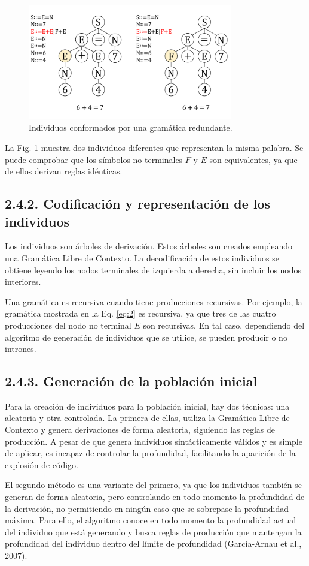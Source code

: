 \documentclass[spanish,a4paper,12pt,twoside]{report}
\begin{document}
    \begin{figure}[H]
      \centering
      \includegraphics[width = 0.8\textwidth]{resources/Fig6.pdf}
      \caption{Individuos conformados por una gramática redundante.}
      \label{fig:6}
    \end{figure} \par
    La Fig. \ref{fig:6} muestra dos individuos diferentes que representan la misma palabra. Se puede comprobar que los símbolos no terminales $F$ y $E$ son equivalentes, ya que de ellos derivan reglas idénticas. \par
    
    \subsection*{\large 2.4.2. Codificación y representación de los individuos}
    Los individuos son árboles de derivación. Estos árboles son creados empleando una Gramática Libre de Contexto. La decodificación de estos individuos se obtiene leyendo los nodos terminales de izquierda a derecha, sin incluir los nodos interiores. \par
    Una gramática es recursiva cuando tiene producciones recursivas. Por ejemplo, la gramática mostrada en la Eq. \ref{eq:2} es recursiva, ya que tres de las cuatro producciones del nodo no terminal $E$ son recursivas. En tal caso, dependiendo del algoritmo de generación de individuos que se utilice, se pueden producir o no intrones. 
    
    \subsection*{\large 2.4.3. Generación de la población inicial}
    Para la creación de individuos para la población inicial, hay dos técnicas: una aleatoria y otra controlada. La primera de ellas, utiliza la Gramática Libre de Contexto y genera derivaciones de forma aleatoria, siguiendo las reglas de producción. A pesar de que genera individuos sintácticamente válidos y es simple de aplicar, es incapaz de controlar la profundidad, facilitando la aparición de la explosión de código. \par
    El segundo método es una variante del primero, ya que los individuos también se generan de forma aleatoria, pero controlando en todo momento la profundidad de la derivación, no permitiendo en ningún caso que se sobrepase la profundidad máxima. Para ello, el algoritmo conoce en todo momento la profundidad actual del individuo que está generando y busca reglas de producción que mantengan la profundidad del individuo dentro del límite de profundidad (García-Arnau et al., 2007).
    
\end{document}
